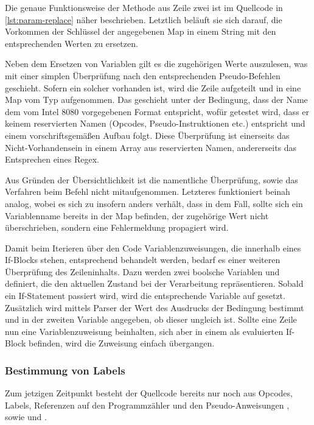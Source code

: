 Die genaue Funktionsweise der Methode  aus Zeile zwei ist im Quellcode in \ref{lst:param-replace} näher beschrieben. Letztlich beläuft sie sich darauf, die Vorkommen der Schlüssel der angegebenen Map in einem String mit den entsprechenden Werten zu ersetzen.

Neben dem Ersetzen von Variablen gilt es die zugehörigen Werte auszulesen, was mit einer simplen Überprüfung nach den entsprechenden Pseudo-Befehlen geschieht. Sofern ein solcher vorhanden ist, wird die Zeile aufgeteilt und in eine Map vom Typ  aufgenommen. Das geschieht unter der Bedingung, dass der Name dem vom Intel 8080 vorgegebenen Format entspricht, wofür getestet wird, dass er keinem reservierten Namen (Opcodes, Pseudo-Instruktionen etc.) entspricht und einem vorschriftsgemäßen Aufbau folgt. Diese Überprüfung ist einerseits das Nicht-Vorhandensein in einem Array aus reservierten Namen, andererseits das Entsprechen eines Regex.

Aus Gründen der Übersichtlichkeit ist die namentliche Überprüfung, sowie das Verfahren beim Befehl  nicht mitaufgenommen. Letzteres funktioniert beinah analog, wobei es sich zu  insofern anders verhält, dass in dem Fall, sollte sich ein Variablenname bereits in der Map befinden, der zugehörige Wert nicht überschrieben, sondern eine Fehlermeldung propagiert wird.

Damit beim Iterieren über den Code Variablenzuweisungen, die innerhalb eines If-Blocks stehen, entsprechend behandelt werden, bedarf es einer weiteren Überprüfung des Zeileninhalts. Dazu werden zwei boolsche Variablen  und  definiert, die den aktuellen Zustand bei der Verarbeitung repräsentieren. Sobald ein If-Statement passiert wird, wird die entsprechende Variable auf  gesetzt. Zusätzlich wird mittels Parser der Wert des Ausdrucks der Bedingung bestimmt und in der zweiten Variable angegeben, ob dieser ungleich \grqq{} ist. Sollte eine Zeile nun eine Variablenzuweisung beinhalten, sich aber in einem als  evaluierten If-Block befinden, wird die Zuweisung einfach übergangen.

\subsubsection{Bestimmung von Labels}

Zum jetzigen Zeitpunkt besteht der Quellcode bereits nur noch aus Opcodes, Labels, Referenzen auf den Programmzähler und den Pseudo-Anweisungen , sowie  und .

